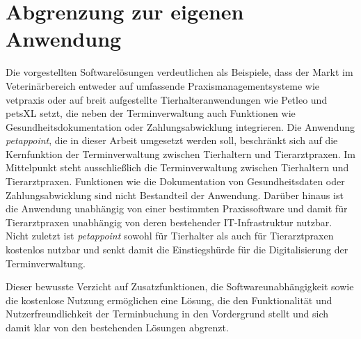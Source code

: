 \section{Abgrenzung zur eigenen Anwendung}
Die vorgestellten Softwarelösungen verdeutlichen als Beispiele, dass der Markt im Veterinärbereich entweder auf umfassende Praxismanagementsysteme wie vetpraxis oder auf breit aufgestellte Tierhalteranwendungen wie Petleo und petsXL setzt, die neben der Terminverwaltung auch Funktionen wie Gesundheitsdokumentation oder Zahlungsabwicklung integrieren. Die Anwendung \textit{petappoint}, die in dieser Arbeit umgesetzt werden soll, beschränkt sich auf die Kernfunktion der Terminverwaltung zwischen Tierhaltern und Tierarztpraxen. Im Mittelpunkt steht ausschließlich die Terminverwaltung zwischen Tierhaltern und Tierarztpraxen. Funktionen wie die Dokumentation von Gesundheitsdaten oder Zahlungsabwicklung sind nicht Bestandteil der Anwendung. Darüber hinaus ist die Anwendung unabhängig von einer bestimmten Praxissoftware und damit für Tierarztpraxen unabhängig von deren bestehender IT-Infrastruktur nutzbar. Nicht zuletzt ist \textit{petappoint} sowohl für Tierhalter als auch für Tierarztpraxen kostenlos nutzbar und senkt damit die Einstiegshürde für die Digitalisierung der Terminverwaltung.

Dieser bewusste Verzicht auf Zusatzfunktionen, die Softwareunabhängigkeit sowie die kostenlose Nutzung ermöglichen eine Lösung, die den Funktionalität und Nutzerfreundlichkeit der Terminbuchung in den Vordergrund stellt und sich damit klar von den bestehenden Lösungen abgrenzt.